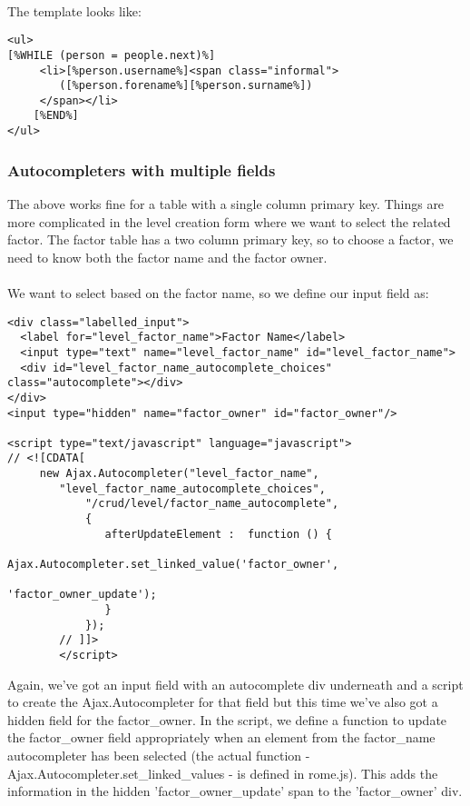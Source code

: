 \paragraph*{}
The template looks like:

\begin{verbatim}
<ul>
[%WHILE (person = people.next)%]
     <li>[%person.username%]<span class="informal">
        ([%person.forename%][%person.surname%])
     </span></li>  
    [%END%]
</ul>
\end{verbatim}



\subsubsection*{Autocompleters with multiple fields}
The above works fine for a table with a single column primary key. Things are more complicated in the level creation form where we want to select the related factor. The factor table has a two column primary key, so to choose a factor, we need to know both the factor name and the factor owner. 

\paragraph*{}
We want to select based on the factor name, so we define our input field as:

\begin{verbatim}
<div class="labelled_input">
  <label for="level_factor_name">Factor Name</label>
  <input type="text" name="level_factor_name" id="level_factor_name">
  <div id="level_factor_name_autocomplete_choices" class="autocomplete"></div>
</div>
<input type="hidden" name="factor_owner" id="factor_owner"/>

<script type="text/javascript" language="javascript">
// <![CDATA[
     new Ajax.Autocompleter("level_factor_name",
	    "level_factor_name_autocomplete_choices",
            "/crud/level/factor_name_autocomplete",
            {           
               afterUpdateElement :  function () {                                   
                    Ajax.Autocompleter.set_linked_value('factor_owner',
                                                        'factor_owner_update');
               } 
            });
        // ]]>
        </script>

\end{verbatim}

Again, we've got an input field with an autocomplete div underneath and a script to create the Ajax.Autocompleter for that field but this time we've also got a hidden field for the factor\_owner. In the script, we define a function to update the factor\_owner field appropriately when an element from the factor\_name autocompleter has been selected (the actual function - Ajax.Autocompleter.set\_linked\_values - is defined in rome.js). This adds the information in the hidden 'factor\_owner\_update' span to the 'factor\_owner' div. 

